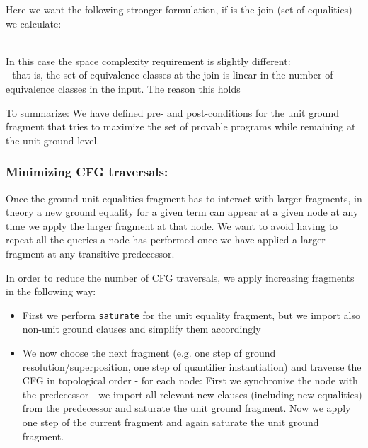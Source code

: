 Here we want the following stronger formulation, if  is the join (set of equalities) we calculate:\\
 \\ 

In this case the space complexity requirement is slightly different:\\
 - that is, the set of equivalence classes at the join is linear in the number of equivalence classes in the input. 
The reason this holds


To summarize:
We have defined pre- and post-conditions for the unit ground fragment that tries to maximize the set of provable programs while remaining at the unit ground level.


\subsubsection*{Minimizing CFG traversals:}
Once the ground unit equalities fragment has to interact with larger fragments, in theory a new ground equality for a given term can appear at a given node at any time we apply the larger fragment at that node. We want to avoid having to repeat all the queries a node has performed once we have applied a larger fragment at any transitive predecessor.

In order to reduce the number of CFG traversals, we apply increasing fragments in the following way:
\begin{itemize}
	\item First we perform \lstinline{saturate} for the unit equality fragment, but we import also non-unit ground clauses and simplify them accordingly
	\item We now choose the next fragment (e.g. one step of ground resolution/superposition, one step of quantifier instantiation) and traverse the CFG in topological order - for each node:
		\subitem First we synchronize the node with the predecessor - we import all relevant new clauses (including new equalities) from the predecessor and saturate the unit ground fragment. 		
		\subitem Now we apply one step of the current fragment and again saturate the unit ground fragment.
\end{itemize}


